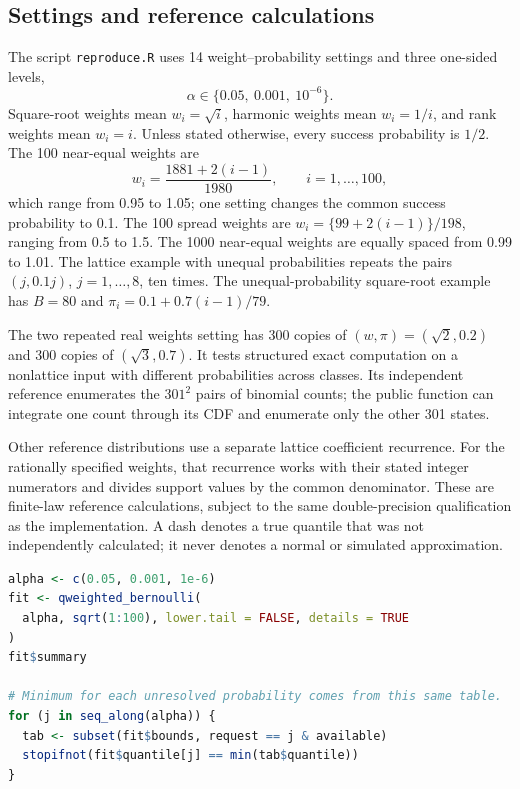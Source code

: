 \documentclass[11pt,letterpaper]{article}
\numberwithin{equation}{section}
\theoremstyle{definition}
\theoremstyle{remark}
\begin{document}
\subsection{Settings and reference calculations}

The script \texttt{reproduce.R} uses 14 weight--probability settings and
three one-sided levels,
\[
  \alpha\in\{0.05,\ 0.001,\ 10^{-6}\}.
\]
Square-root weights mean $w_i=\sqrt{i}$, harmonic weights mean $w_i=1/i$,
and rank weights mean $w_i=i$. Unless stated otherwise, every success
probability is $1/2$. The 100 near-equal weights are
\[
 w_i=\frac{1881+2(i-1)}{1980},\qquad i=1,\ldots,100,
\]
which range from 0.95 to 1.05; one setting changes the common success
probability to 0.1. The 100 spread weights are
$w_i=\{99+2(i-1)\}/198$, ranging from 0.5 to 1.5. The 1000 near-equal
weights are equally spaced from 0.99 to 1.01. The lattice example with
unequal probabilities repeats the pairs $(j,0.1j)$, $j=1,\ldots,8$,
ten times. The unequal-probability square-root example has $B=80$ and
$\pi_i=0.1+0.7(i-1)/79$.

The two repeated real weights setting has 300 copies of
$(w,\pi)=(\sqrt2,0.2)$ and 300 copies of $(\sqrt3,0.7)$. It tests
structured exact computation on a nonlattice input with different
probabilities across classes. Its independent reference enumerates the
$301^2$ pairs of binomial counts; the public function can integrate one
count through its CDF and enumerate only the other 301 states.

Other reference distributions use a separate lattice coefficient
recurrence. For the rationally specified weights, that recurrence works
with their stated integer numerators and divides support values by the
common denominator. These are finite-law reference calculations, subject
to the same double-precision qualification as the implementation.
A dash denotes a true quantile that was not independently calculated;
it never denotes a normal or simulated approximation.

\par\noindent\begin{minipage}{\linewidth}
\begin{lstlisting}[language=R]
alpha <- c(0.05, 0.001, 1e-6)
fit <- qweighted_bernoulli(
  alpha, sqrt(1:100), lower.tail = FALSE, details = TRUE
)
fit$summary

# Minimum for each unresolved probability comes from this same table.
for (j in seq_along(alpha)) {
  tab <- subset(fit$bounds, request == j & available)
  stopifnot(fit$quantile[j] == min(tab$quantile))
}
\end{lstlisting}
\end{minipage}\par
\end{document}

